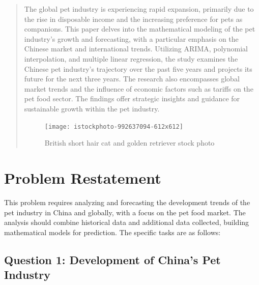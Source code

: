 \documentclass[withoutpreface,bwprint]{cumcmthesis} %
\title{}
\begin{document}
\pagestyle{fancy}
\fancyhf{}
\lhead{\small \team}
 \maketitle
 \begin{abstract}
    The global pet industry is experiencing rapid expansion, primarily due to the rise in disposable income and the increasing preference for pets as companions. This paper delves into the mathematical modeling of the pet industry's growth and forecasting, with a particular emphasis on the Chinese market and international trends. Utilizing ARIMA, polynomial interpolation, and multiple linear regression, the study examines the Chinese pet industry's trajectory over the past five years and projects its future for the next three years. The research also encompasses global market trends and the influence of economic factors such as tariffs on the pet food sector. The findings offer strategic insights and guidance for sustainable growth within the pet industry.
\begin{figure}[htbp]
	\centering
	\texttt{[image: istockphoto-992637094-612x612]}
	\caption{British short hair cat and golden retriever stock photo\cite{1}}
\end{figure}

\end{abstract}
\tableofcontents
\setcounter{page}{1}
\section{Problem Restatement}

This problem requires analyzing and forecasting the development trends of the pet industry in China and globally, with a focus on the pet food market. The analysis should combine historical data and additional data collected, building mathematical models for prediction. The specific tasks are as follows:
\subsection{Question 1: Development of China's Pet Industry}
\end{document}
